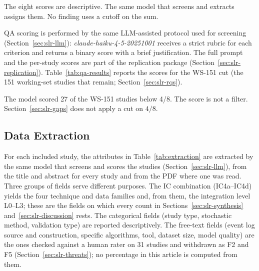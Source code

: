 The eight scores are descriptive. The same model that screens and extracts
assigns them. No finding uses a cutoff on the sum.

QA scoring is performed by the same LLM-assisted protocol used for screening
(Section~\ref{sec:slr-llm}): \textit{claude-haiku-4-5-20251001} receives a
strict rubric for each criterion and returns a binary score with a brief
justification. The full prompt and the per-study scores are part of the
replication package (Section~\ref{sec:slr-replication}).
Table~\ref{tab:qa-results} reports the scores for the WS-151 cut (the
151 working-set studies that remain; Section~\ref{sec:slr-rqs}).



The model scored 27 of the WS-151 studies below 4/8.
The score is not a filter. Section~\ref{sec:slr-gaps} does not apply a cut
on $4/8$.


\subsection{Data Extraction}
\label{sec:slr-extraction}

For each included study, the attributes in Table~\ref{tab:extraction} are
extracted by the same model that screens and scores the studies
(Section~\ref{sec:slr-llm}), from the title and abstract for every study
and from the PDF where one was read. Three groups of fields serve
different purposes. The IC combination (IC4a--IC4d) yields the four
technique and data families and, from them, the integration level
L0--L3; these are the fields on which every count in
Sections~\ref{sec:slr-synthesis} and~\ref{sec:slr-discussion} rests. The
categorical fields (study type, stochastic method, validation type) are
reported descriptively. The free-text fields (event log source and
construction, specific algorithms, tool, dataset size, model quality) are
the ones checked against a human rater on 31 studies and withdrawn as F2
and F5 (Section~\ref{sec:slr-threats}); no percentage in this article is
computed from them.

